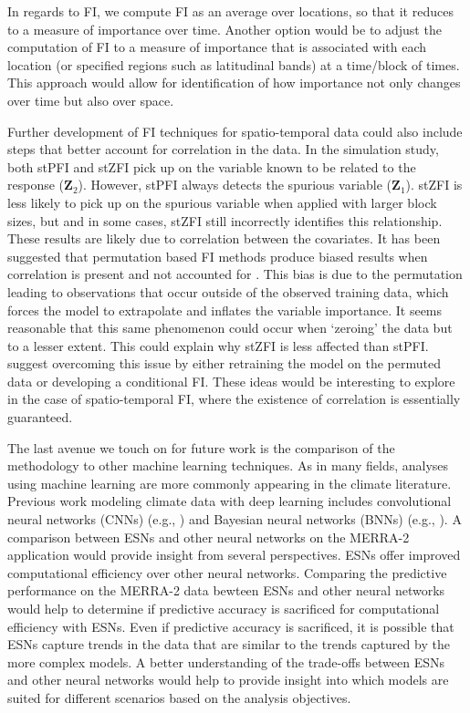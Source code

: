 \documentclass[AMS,STIX2COL]{WileyNJD-v2}
\begin{document}
In regards to FI, we compute FI as an average over locations, so that it reduces to a measure of importance over time. Another option would be to adjust the computation of FI to a measure of importance that is associated with each location (or specified regions such as latitudinal bands) at a time/block of times. This approach would allow for identification of how importance not only changes over time but also over space.

Further development of FI techniques for spatio-temporal data could also include steps that better account for correlation in the data. In the simulation study, both stPFI and stZFI pick up on the variable known to be related to the response ($\textbf{Z}_2$). However, stPFI always detects the spurious variable ($\textbf{Z}_1$). stZFI is less likely to pick up on the spurious variable when applied with larger block sizes, but and in some cases, stZFI still incorrectly identifies this relationship. These results are likely due to correlation between the covariates. It has been suggested that permutation based FI methods produce biased results when correlation is present and not accounted for \citep{hooker2021}. This bias is due to the permutation leading to observations that occur outside of the observed training data, which forces the model to extrapolate and inflates the variable importance. It seems reasonable that this same phenomenon could occur when `zeroing' the data but to a lesser extent. This could explain why stZFI is less affected than stPFI. \citet{hooker2021} suggest overcoming this issue by either retraining the model on the permuted data or developing a conditional FI. These ideas would be interesting to explore in the case of spatio-temporal FI, where the existence of correlation is essentially guaranteed.

The last avenue we touch on for future work is the comparison of the methodology to other machine learning techniques. As in many fields, analyses using machine learning are more commonly appearing in the climate literature. Previous work modeling climate data with deep learning includes convolutional neural networks (CNNs) (e.g., \citet{mamalakis2022explainable}) and Bayesian neural networks (BNNs) (e.g.,  \citet{clare2022}). A comparison between ESNs and other neural networks on the MERRA-2 application would provide insight from several perspectives. ESNs offer improved computational efficiency over other neural networks. Comparing the predictive performance on the MERRA-2 data bewteen ESNs and other neural networks would help to determine if predictive accuracy is sacrificed for computational efficiency with ESNs. Even if predictive accuracy is sacrificed, it is possible that ESNs capture trends in the data that are similar to the trends captured by the more complex models. A better understanding of the trade-offs between ESNs and other neural networks would help to provide insight into which models are suited for different scenarios based on the analysis objectives.
\end{document}
